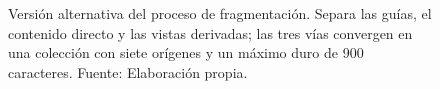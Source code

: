 \begin{figure}[H]
{%
  }
  \caption[Alternativa del proceso de fragmentación]{\textcolor{borrador2}{Versión alternativa del proceso de fragmentación. Separa las guías, el contenido directo y las vistas derivadas; las tres vías convergen en una colección con siete orígenes y un máximo duro de 900 caracteres. Fuente: Elaboración propia.}}
  \label{fig:secuencia_chunking_alt}
\end{figure}
\endgroup
